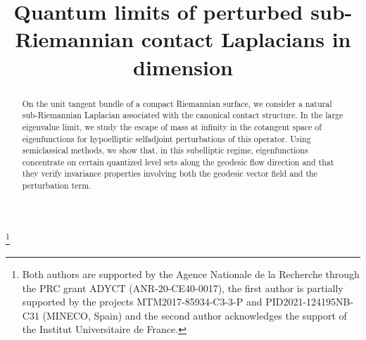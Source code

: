 \documentclass[JEP,XML,SOM,Unicode, NoEqCountersInSection,published]{cedram}
\theoremstyle{plain}
\theoremstyle{definition}
\theoremstyle{remark}
\begin{document}
\title[Quantum limits of perturbed sub-Riemannian Laplacians in dimension 3]{Quantum limits of perturbed sub-Riemannian contact Laplacians in dimension}

\author[\initial{V.} \lastname{Arnaiz}]{ }
\address{Laboratoire de Mathématiques Jean Leray, Nantes Université, UMR CNRS 6629,\\
2 rue de la Houssinière, 44322 Nantes Cedex 03, France}
\urladdr{}

\author[\initial{G.} \lastname{Rivière}]{ }
\address{Laboratoire de Mathématiques Jean Leray, Nantes Université, UMR CNRS 6629,\\
2 rue de la Houssinière, 44322 Nantes Cedex 03, France\\
\& Institut Universitaire de France, Paris, France}

\thanks{Both authors are supported by the Agence Nationale de la Recherche through the PRC grant ADYCT (ANR-20-CE40-0017), the first author is partially supported by the projects MTM2017-85934-C3-3-P and PID2021-124195NB-C31 (MINECO,
Spain) and the second author acknowledges the support of the Institut Universitaire de France.}

\begin{abstract}
On the unit tangent bundle of a compact Riemannian surface, we consider a natural sub-Riemannian Laplacian associated with the canonical contact structure. In the large eigenvalue limit, we study the escape of mass at infinity in the cotangent space of eigenfunctions for hypoelliptic selfadjoint perturbations of this operator. Using semiclassical methods, we show that, in this subelliptic regime, eigenfunctions concentrate on certain quantized level sets along the geodesic flow direction and that they verify invariance properties involving both the geodesic vector field and the perturbation term.
\end{abstract}




\end{document}
